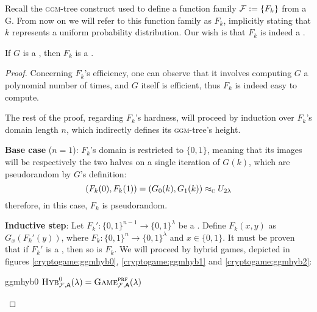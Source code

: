 
Recall the \textsc{ggm}-tree construct used to define a function family $\mathcal{F} := \{F_k\}$ from a \prg{} G. From now on we will refer to this function family as $F_k$, implicitly stating that $k$ represents a uniform probability distribution. Our wish is that $F_k$ is indeed a \prf. 

\begin{theorem}
    If $G$ is a \prg, then $F_k$ is a \prf.
\end{theorem}

\begin{proof}

    Concerning $F_k$'s efficiency, one can observe that it involves computing $G$ a polynomial number of times, and $G$ itself is efficient, thus $F_k$ is indeed easy to compute.

    The rest of the proof, regarding $F_k$'s hardness, will proceed by induction over $F_k$'s domain length $n$, which indirectly defines its \textsc{ggm}-tree's height.
    
    \textbf{Base case} ($n=1$): $F_k$'s domain is restricted to $\{0, 1\}$, meaning that its images will be respectively the two halves on a single iteration of $G(k)$, which are pseudorandom by $G$'s definition:
    \[
        (F_k(0), F_k(1))=(G_0(k), G_1(k)) \approx_\textsc{c} U_{2\lambda}
    \]
    therefore, in this case, $F_k$ is pseudorandom.

    \textbf{Inductive step}: Let $F_k' : \{0, 1\}^{n-1} \to \{0, 1\}^\lambda$ be a \prf. Define $F_k(x,y)$ as $G_x(F_k'(y))$, where $F_k : \{0, 1\}^n \to \{0, 1\}^\lambda$ and $x \in \{0, 1\}$. It must be proven that if $F_k'$ is a \prf, then so is $F_k$. We will proceed by hybrid games, depicted in figures \ref{cryptogame:ggmhyb0}, \ref{cryptogame:ggmhyb1} and \ref{cryptogame:ggmhyb2}:

    \begin{cryptogame}
        {ggmhyb0}
        {$\hybridg{0}[\F](\lambda) = \cryptog{prf}[\F](\lambda)$}
        {}



\end{cryptogame}
\end{proof}
